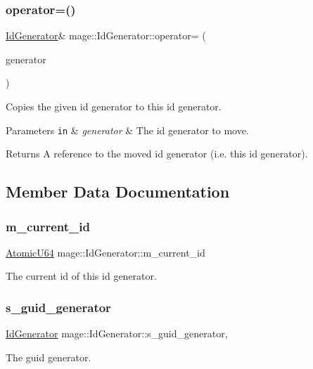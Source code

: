 \subsubsection{\texorpdfstring{operator=()}{operator=()}\hspace{0.1cm}{\footnotesize\ttfamily [2/2]}}
{\footnotesize\ttfamily \hyperlink{classmage_1_1_id_generator}{Id\+Generator}\& mage\+::\+Id\+Generator\+::operator= (\begin{DoxyParamCaption}\item[{\hyperlink{classmage_1_1_id_generator}{Id\+Generator} \&\&}]{generator }\end{DoxyParamCaption})\hspace{0.3cm}{\ttfamily [delete]}}

Copies the given id generator to this id generator.


\begin{DoxyParams}[1]{Parameters}
\mbox{\tt in}  & {\em generator} & The id generator to move. \\
\hline
\end{DoxyParams}
\begin{DoxyReturn}{Returns}
A reference to the moved id generator (i.\+e. this id generator). 
\end{DoxyReturn}


\subsection{Member Data Documentation}
\hypertarget{classmage_1_1_id_generator_ab8c5396d9050530ce030b3c8e2f6b62f}{}\label{classmage_1_1_id_generator_ab8c5396d9050530ce030b3c8e2f6b62f} 
\subsubsection{\texorpdfstring{m\+\_\+current\+\_\+id}{m\_current\_id}}
{\footnotesize\ttfamily \hyperlink{namespacemage_a694beb1edf301f410ce0b33c96b09871}{Atomic\+U64} mage\+::\+Id\+Generator\+::m\+\_\+current\+\_\+id\hspace{0.3cm}{\ttfamily [private]}}

The current id of this id generator. \hypertarget{classmage_1_1_id_generator_aae064239698f2a64515bc0e91ff9a303}{}\label{classmage_1_1_id_generator_aae064239698f2a64515bc0e91ff9a303} 
\subsubsection{\texorpdfstring{s\+\_\+guid\+\_\+generator}{s\_guid\_generator}}
{\footnotesize\ttfamily \hyperlink{classmage_1_1_id_generator}{Id\+Generator} mage\+::\+Id\+Generator\+::s\+\_\+guid\+\_\+generator\hspace{0.3cm}{\ttfamily [static]}, {\ttfamily [private]}}

The guid generator. 